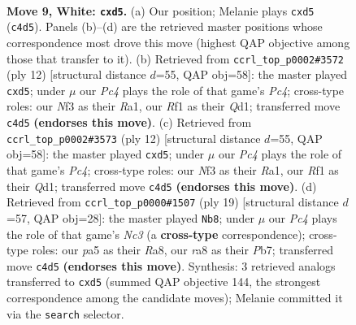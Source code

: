 \documentclass[11pt]{article}
\begin{document}
\clearpage

\begin{figure}[p]\centering
\begin{subfigure}{0.46\textwidth}\centering
\resizebox{\linewidth}{!}{%
\newchessgame
\chessboard[
  setfen={rnbq1rk1/1p2bpp1/4pn2/p1pp3p/2P5/1P2PNPB/P2P1P1P/RNBQ1RK1 w - - 0 9},
  showmover=false,
  pgfstyle=straightmove, color=movearrow, markmove={c4-d5}
]}
\caption{}
\end{subfigure}\hfill
\begin{subfigure}{0.46\textwidth}\centering
\resizebox{\linewidth}{!}{%
\newchessgame
\chessboard[
  setfen={rnbq1rk1/pp2bppp/4pn2/2pp4/2P5/1PN1PN2/PB1P1PPP/R2QKB1R w KQ - 0 7},
  showmover=false,
  pgfstyle=straightmove, color=movearrow, markmove={c4-d5}
]}
\caption{}
\end{subfigure}
\\[4pt]
\begin{subfigure}{0.46\textwidth}\centering
\resizebox{\linewidth}{!}{%
\newchessgame
\chessboard[
  setfen={rnbq1rk1/pp2bppp/4pn2/2pp4/2P5/1PN1PN2/PB1P1PPP/R2QKB1R w KQ - 0 7},
  showmover=false,
  pgfstyle=straightmove, color=movearrow, markmove={c4-d5}
]}
\caption{}
\end{subfigure}\hfill
\begin{subfigure}{0.46\textwidth}\centering
\resizebox{\linewidth}{!}{%
\newchessgame
\chessboard[
  setfen={r2q1rk1/1pp2pbp/2np1np1/pP2pb2/2P5/P2PPN2/1B2BPPP/RN1Q1RK1 b - - 0 10},
  showmover=false,
  pgfstyle=straightmove, color=movearrow, markmove={c6-b8}
]}
\caption{}
\end{subfigure}
\caption{\textbf{Move 9, White: \texttt{cxd5}.} (a) Our position; Melanie plays \texttt{cxd5} (\texttt{c4d5}). Panels (b)--(d) are the retrieved master positions whose correspondence most drove this move (highest QAP objective among those that transfer to it). (b) Retrieved from \texttt{ccrl\_top\_p0002\#3572} (ply 12) [structural distance $d$=55, QAP obj=58]: the master played \texttt{cxd5}; under $\mu$ our \emph{Pc4} plays the role of that game's \emph{Pc4}; cross-type roles: our \emph{N}f3 as their \emph{R}a1, our \emph{R}f1 as their \emph{Q}d1; transferred move \texttt{c4d5} \textbf{(endorses this move)}. (c) Retrieved from \texttt{ccrl\_top\_p0002\#3573} (ply 12) [structural distance $d$=55, QAP obj=58]: the master played \texttt{cxd5}; under $\mu$ our \emph{Pc4} plays the role of that game's \emph{Pc4}; cross-type roles: our \emph{N}f3 as their \emph{R}a1, our \emph{R}f1 as their \emph{Q}d1; transferred move \texttt{c4d5} \textbf{(endorses this move)}. (d) Retrieved from \texttt{ccrl\_top\_p0000\#1507} (ply 19) [structural distance $d$=57, QAP obj=28]: the master played \texttt{Nb8}; under $\mu$ our \emph{Pc4} plays the role of that game's \emph{Nc3} (a \textbf{cross-type} correspondence); cross-type roles: our \emph{p}a5 as their \emph{R}a8, our \emph{r}a8 as their \emph{P}b7; transferred move \texttt{c4d5} \textbf{(endorses this move)}. Synthesis: 3 retrieved analogs transferred to \texttt{cxd5} (summed QAP objective 144, the strongest correspondence among the candidate moves); Melanie committed it via the \texttt{search} selector.}
\label{fig:thought-m16}
\end{figure}
\end{document}
